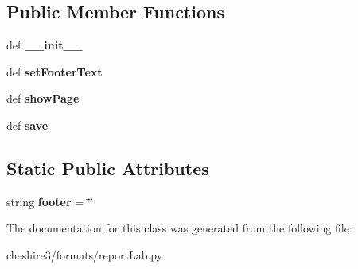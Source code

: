 \subsection*{Public Member Functions}
\begin{DoxyCompactItemize}
\item 
\hypertarget{classcheshire3_1_1formats_1_1report_lab_1_1_numbered_canvas_a3959f03db2c8efc570fd1266df915c26}{def {\bfseries \-\_\-\-\_\-init\-\_\-\-\_\-}}\label{classcheshire3_1_1formats_1_1report_lab_1_1_numbered_canvas_a3959f03db2c8efc570fd1266df915c26}

\item 
\hypertarget{classcheshire3_1_1formats_1_1report_lab_1_1_numbered_canvas_a6a86c173ce8518024adf7a3e87f5ba57}{def {\bfseries set\-Footer\-Text}}\label{classcheshire3_1_1formats_1_1report_lab_1_1_numbered_canvas_a6a86c173ce8518024adf7a3e87f5ba57}

\item 
\hypertarget{classcheshire3_1_1formats_1_1report_lab_1_1_numbered_canvas_a26b2357071b3060dd4f2873d775cce37}{def {\bfseries show\-Page}}\label{classcheshire3_1_1formats_1_1report_lab_1_1_numbered_canvas_a26b2357071b3060dd4f2873d775cce37}

\item 
\hypertarget{classcheshire3_1_1formats_1_1report_lab_1_1_numbered_canvas_a9e65763d95bebc17cc629df033e4ea34}{def {\bfseries save}}\label{classcheshire3_1_1formats_1_1report_lab_1_1_numbered_canvas_a9e65763d95bebc17cc629df033e4ea34}

\end{DoxyCompactItemize}
\subsection*{Static Public Attributes}
\begin{DoxyCompactItemize}
\item 
\hypertarget{classcheshire3_1_1formats_1_1report_lab_1_1_numbered_canvas_a1c1a635a867fd8566f58589073071ab7}{string {\bfseries footer} = \char`\"{}\char`\"{}}\label{classcheshire3_1_1formats_1_1report_lab_1_1_numbered_canvas_a1c1a635a867fd8566f58589073071ab7}

\end{DoxyCompactItemize}


The documentation for this class was generated from the following file\-:\begin{DoxyCompactItemize}
\item 
cheshire3/formats/report\-Lab.\-py\end{DoxyCompactItemize}
